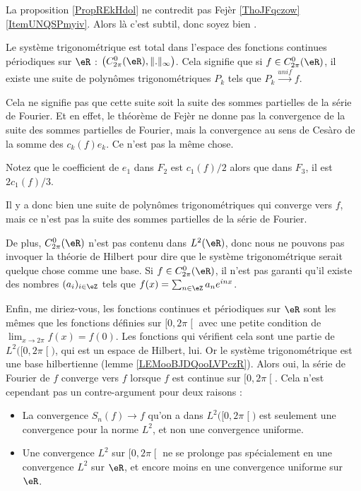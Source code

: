 \begin{normaltext}      \label{NORMooGKKWooFmOBeE}
	La proposition \ref{PropREkHdol} ne contredit pas Fejèr \ref{ThoJFqczow}\ref{ItemUNQSPmyiv}. Alors là c'est subtil, donc soyez bien .

	Le système trigonométrique est total dans l'espace des fonctions continues périodiques sur \( \eR\) : \( \big(  C^0_{2\pi}(\eR),\| . \|_{\infty}\big)\). Cela signifie que si \( f\in C^0_{2\pi}(\eR)\), il  existe une suite de polynômes trigonométriques \( P_k\) tels que \( P_k\stackrel{unif}{\longrightarrow}f\).

	Cela ne signifie pas que cette suite soit la suite des sommes partielles de la série de Fourier. Et en effet, le théorème de Fejèr ne donne pas la convergence de la suite des sommes partielles de Fourier, mais la convergence au sens de Cesàro de la somme des \( c_k(f)e_k\). Ce n'est pas la même chose.

	Notez que le coefficient de \( e_1\) dans \( F_2\) est \( c_1(f)/2\) alors que dans \( F_3\), il est \( 2c_1(f)/3\).

	Il y a donc bien une suite de polynômes trigonométriques qui converge vers \( f\), mais ce n'est pas la suite des sommes partielles de la série de Fourier.

	De plus, \( C^0_{2\pi}(\eR)\) n'est pas contenu dans \( L^2(\eR)\), donc nous ne pouvons pas invoquer la théorie de Hilbert pour dire que le système trigonométrique serait quelque chose comme une base. Si \( f\in C^0_{2\pi}(\eR)\), il n'est pas garanti qu'il existe des nombres \( (a_i)_{i\in \eZ}\) tels que \( f(x)=\sum_{n\in \eZ}a_n e^{inx}\).

	Enfin, me diriez-vous, les fonctions continues et périodiques sur \( \eR\) sont les mêmes que les fonctions définies sur \( \mathopen[ 0 , 2\pi \mathclose[\) avec une petite condition de \( \lim_{x\to 2\pi} f(x)=f(0)\). Les fonctions qui vérifient cela sont une partie de \( L^2\big( \mathopen[ 0 , 2\pi \mathclose[ \big)\), qui est un espace de Hilbert, lui. Or le système trigonométrique est une base hilbertienne (lemme \ref{LEMooBJDQooLVPczR}). Alors oui, la série de Fourier de \( f\) converge vers \( f\) lorsque \( f\) est continue sur \( \mathopen[ 0 , 2\pi \mathclose[\). Cela n'est cependant pas un contre-argument pour deux raisons :
	\begin{itemize}
		\item
		      La convergence \( S_n(f)\to f\) qu'on a dans \( L^2\big( \mathopen[ 0 , 2\pi \mathclose[ \big)\) est seulement une convergence pour la norme \( L^2\), et non une convergence uniforme.
		\item
		      Une convergence \( L^2\) sur \( \mathopen[ 0 , 2\pi \mathclose[\) ne se prolonge pas spécialement en une convergence \( L^2\) sur \( \eR\), et encore moins en une convergence uniforme sur \( \eR\).
	\end{itemize}
\end{normaltext}


